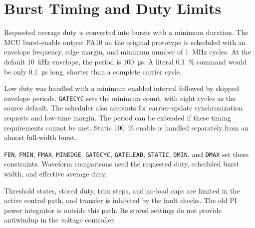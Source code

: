 \section{Burst Timing and Duty Limits}
\label{sec:ctrl-limits}

Requested average duty is converted into bursts with a minimum duration. The MCU burst-enable output PA10 on the original prototype is scheduled with an envelope frequency, edge margin, and minimum number of \SI{1}{\mega\hertz} cycles. At the default \SI{10}{\kilo\hertz} envelope, the period is \SI{100}{\micro\second}. A literal \SI{0.1}{\percent} command would be only \SI{0.1}{\micro\second} long, shorter than a complete carrier cycle.

Low duty was handled with a minimum enabled interval followed by skipped envelope periods. \texttt{GATECYC} sets the minimum count, with eight cycles as the source default. The scheduler also accounts for carrier-update synchronization requests and low-time margin. The period can be extended if these timing requirements cannot be met. Static \SI{100}{\percent} enable is handled separately from an almost full-width burst.

\texttt{FEN}, \texttt{FMIN}, \texttt{FMAX}, \texttt{MINEDGE}, \texttt{GATECYC}, \texttt{GATELEAD}, \texttt{STATIC}, \texttt{DMIN}, and \texttt{DMAX} set these constraints. Waveform comparisons need the requested duty, scheduled burst width, and effective average duty.

Threshold states, stored duty, trim steps, and no-load caps are limited in the active control path, and transfer is inhibited by the fault checks. The old PI power integrator is outside this path. Its stored settings do not provide antiwindup in the voltage controller.
